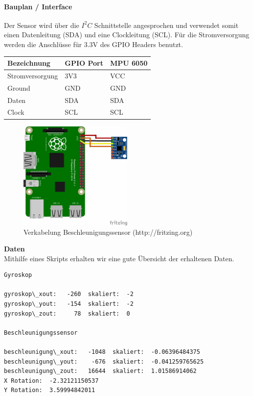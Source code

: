 \documentclass[../../main.tex]{subfiles}
\begin{document}
\paragraph{Bauplan / Interface}
Der Sensor wird über die $I^2C$ Schnittstelle angesprochen und verwendet somit einen Datenleitung (SDA) und eine Clockleitung (SCL). Für die Stromversorgung werden die Anschlüsse für 3.3V des GPIO Headers benutzt.

\begin{table}[H]
\begin{center}
\begin{tabular}{lll}
Bezeichnung     & GPIO Port & MPU 6050 \\ \hline
Stromversorgung & 3V3      & VCC      \\ \hline
Ground          & GND      & GND      \\ \hline
Daten          & SDA      & SDA       \\ \hline
Clock          & SCL      & SCL       \\ \hline
\end{tabular}
\end{center}
\end{table}

\begin{figure}[H] \centering
  \includegraphics[width=0.5\textwidth, angle=90]{Verkabelung_BeschlSensor}
  \caption{Verkabelung Beschleunigungssensor (http://fritzing.org)}
  \label{fig:Beschleunigungssensor}
\end{figure}

\textbf{Daten}\\
Mithilfe eines Skripts erhalten wir eine gute Übersicht der erhaltenen Daten.

\begin{lstlisting}
Gyroskop

gyroskop\_xout:   -260  skaliert:  -2
gyroskop\_yout:   -154  skaliert:  -2
gyroskop\_zout:     78  skaliert:  0

Beschleunigungssensor

beschleunigung\_xout:   -1048  skaliert:  -0.06396484375
beschleunigung\_yout:    -676  skaliert:  -0.041259765625
beschleunigung\_zout:   16644  skaliert:  1.01586914062
X Rotation:  -2.32121150537
Y Rotation:  3.59994842011
\end{lstlisting}
\end{document}
